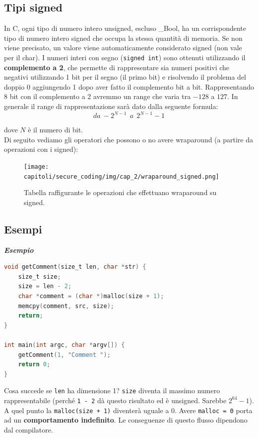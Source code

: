 \subsection{Tipi signed}

In C, ogni tipo di numero intero unsigned, escluso \_Bool, ha un corrispondente
tipo di numero intero signed che occupa la stessa quantità di memoria.
Se non viene precisato, un valore viene automaticamente considerato signed
(non vale per il char).
I numeri interi con segno (\verb|signed int|) sono ottenuti utilizzando il \textbf{complemento a 2},
che permette di rappresentare sia numeri positivi
che negativi utilizzando 1 bit per il segno (il primo bit) e risolvendo il problema del doppio 0 aggiungendo
1 dopo aver fatto il complemento bit a bit.
Rappresentando 8 bit con il complemento a 2 avremmo un range che varia tra $-128$ a $127$.
In generale il range di rappresentazione sarà dato dalla seguente formula:
\[
    da \ -2^{N - 1} \ \ a \ \ 2^{N - 1} - 1
\]

dove $N$ è il numero di bit.\\
Di seguito vediamo gli operatori che possono o no avere wraparound (a partire da
operazioni con i signed):

\begin{figure}[H]
    \centering
    \texttt{[image: capitoli/secure\_coding/img/cap\_2/wraparound\_signed.png]}
    \caption{Tabella raffigurante le operazioni che effettuano wraparound su signed.}
\end{figure}

\newpage

\subsection{Esempi}

\textbf{\textit{Esempio}}

\begin{lstlisting}[language=C,  basicstyle=\scriptsize]
void getComment(size_t len, char *str) {
    size_t size;
    size = len - 2;
    char *comment = (char *)malloc(size + 1);
    memcpy(comment, src, size);
    return;
}

int main(int argc, char *argv[]) {
    getComment(1, "Comment ");
    return 0;
}\end{lstlisting}

Cosa succede se \verb|len| ha dimensione 1? \verb|size| diventa il massimo
numero rappresentabile (perché \verb|1 - 2| dà questo risultato ed è unsigned.
Sarebbe \(2^{64} - 1\)). A quel punto la \verb|malloc(size + 1)| diventerà uguale a
0. Avere \verb|malloc = 0| porta ad un \textbf{comportamento indefinito}. Le
conseguenze di questo flusso dipendono dal compilatore.\\

